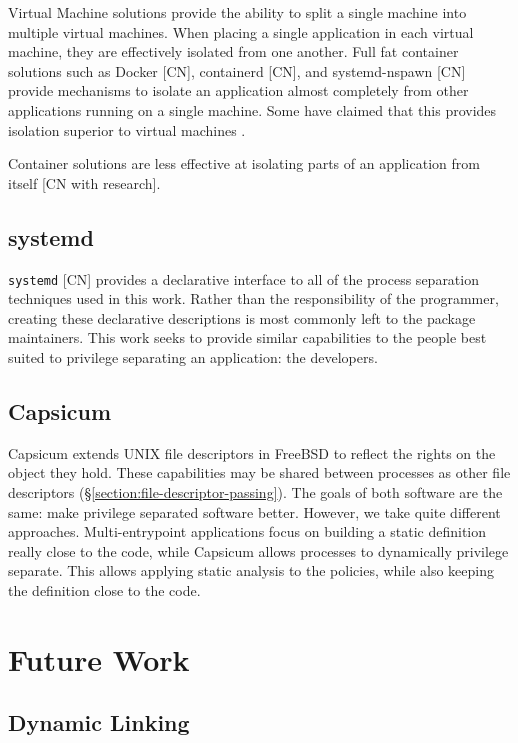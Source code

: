 \documentclass[sigplan]{acmart}
\begin{document}
Virtual Machine solutions \citep{barham_xen_2003,vmware_inc_understanding_2008} provide the ability to split a single machine into multiple virtual machines. When placing a single application in each virtual machine, they are effectively isolated from one another. Full fat container solutions such as Docker [CN], containerd [CN], and systemd-nspawn [CN] provide mechanisms to isolate an application almost completely from other applications running on a single machine. Some have claimed that this provides isolation superior to virtual machines \citep{soltesz_container-based_2007}.

Container solutions are less effective at isolating parts of an application from itself [CN with research].

\subsection{systemd}

\texttt{systemd} [CN] provides a declarative interface to all of the process separation techniques used in this work. Rather than the responsibility of the programmer, creating these declarative descriptions is most commonly left to the package maintainers. This work seeks to provide similar capabilities to the people best suited to privilege separating an application: the developers.

\subsection{Capsicum}

Capsicum \citep{watson_capsicum_2010} extends UNIX file descriptors in FreeBSD to reflect the rights on the object they hold. These capabilities may be shared between processes as other file descriptors (§\ref{section:file-descriptor-passing}). The goals of both software are the same: make privilege separated software better. However, we take quite different approaches. Multi-entrypoint applications focus on building a static definition really close to the code, while Capsicum allows processes to dynamically privilege separate. This allows applying static analysis to the policies, while also keeping the definition close to the code.

\section{Future Work}

\subsection{Dynamic Linking}
\end{document}
